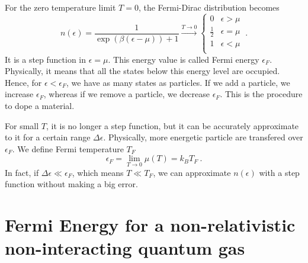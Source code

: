     For the zero temperature limit $T = 0$, the Fermi-Dirac distribution becomes 
    \begin{equation*}
        n(\epsilon) = \frac{1}{\exp(\beta(\epsilon - \mu)) + 1} \xrightarrow{T \rightarrow 0} \begin{cases}
            0 & \epsilon > \mu \\
            \frac{1}{2} & \epsilon = \mu \\
            1 & \epsilon < \mu \\
        \end{cases} ~.
    \end{equation*} 
    It is a step function in $\epsilon = \mu$. This energy value is called Fermi energy $\epsilon_F$. Physically, it means that all the states below this energy level are occupied. Hence, for $\epsilon < \epsilon_F$, we have as many states as particles. If we add a particle, we increase $\epsilon_F$, whereas if we remove a particle, we decrease $\epsilon_F$. This is the procedure to dope a material.

    For small $T$, it is no longer a step function, but it can be accurately approximate to it for a certain range $\Delta \epsilon$. Physically, more energetic particle are transfered over $\epsilon_F$. We define Fermi temperature $T_F$
    \begin{equation*}
        \epsilon_F = \lim_{T \rightarrow 0} \mu (T) = k_B T_F ~.
    \end{equation*}
    In fact, if $\Delta \epsilon \ll \epsilon_F$, which means $T \ll T_F$, we can approximate $n(\epsilon)$ with a step function without making a big error. 

\section{Fermi Energy for a non-relativistic non-interacting quantum gas} 

